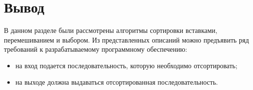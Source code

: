\section{Вывод}

В данном разделе были рассмотрены алгоритмы сортировки вставками,
перемешиванием и выбором. Из представленных описаний можно предъявить ряд
требований к разрабатываемому программному обеспечению:
\begin{itemize}[left=\parindent]
    \item на вход подается последовательность, которую необходимо
          отсортировать;
    \item на выходе должна выдаваться отсортированная последовательность.
\end{itemize}
